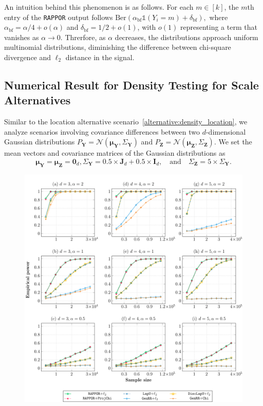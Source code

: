 \documentclass[twoside,11pt]{article}
\newcommand{\rvTwo}{Y}
\newcommand{\rvThree}{Z}
\newcommand{\vectorize}[1]{\mathbf{#1}}
\newcommand{\sampleIndexOne}{i}
\newcommand{\dimDensity}{d} %
\newcommand{\alphabetSize}{k} %
\newcommand{\vectorIndex}{m}
\newcommand{\privacyParameter}{\alpha} %
\newcommand{\privacyParameterrappor}{\privacyParameter_{\mathrm{bf}}}
\newcommand{\smallNumber}{\delta}
\newcommand{\smallNumberrappor}{\smallNumber_{\mathrm{bf}}}
\begin{document}
\begin{appendix}
	An intuition behind this phenomenon is as follows. For each $\vectorIndex \in [\alphabetSize]$, the $\vectorIndex$th entry of the \texttt{RAPPOR} output follows  
	$
	\mathrm{Ber} \left( \privacyParameterrappor \mathds{1}(\rvTwo_{\sampleIndexOne} = \vectorIndex) + \smallNumberrappor \right),
	$
	where $\privacyParameterrappor = \privacyParameter/4 + o(\privacyParameter)$ and $\smallNumberrappor = 1/2 + o(1)$, with \( o(1) \) representing a term that vanishes as $\privacyParameter \to 0$. Threrfore, as $\privacyParameter$ decreases, the distributions approach uniform multinomial distributions, diminishing the difference between chi-square divergence and $\ell_2$ distance in the signal.
	
	\subsection{Numerical Result for Density Testing for Scale Alternatives}\label{simul_scale}
	Similar to the location alternative scenario~\eqref{alternative:density_location}, we analyze scenarios involving covariance differences between two $\dimDensity$-dimensional Gaussian distributions
	$P_{\vectorize{\rvTwo}} = \mathcal{N}(
	\boldsymbol{\mu}_{\vectorize{\rvTwo}}
	,
	\Sigma_{\vectorize{\rvTwo}}
	)$
	and
	$P_{\vectorize{\rvThree}} = \mathcal{N}(
	\boldsymbol{\mu}_{\vectorize{\rvThree}}
	,
	\Sigma_{\vectorize{\rvThree}}
	)$. 
	We set the mean vectors and covariance matrices of the Gaussian distributions as
	\begin{equation}\label{alternative:density_scale}
		\boldsymbol{\mu}_{\vectorize{\rvTwo}}
		=
		\boldsymbol{\mu}_{\vectorize{\rvThree}}
		= \mathbf{0}_{\dimDensity},
		\Sigma_{\vectorize{\rvTwo}} = 
		0.5\times \mathbf{J}_{\dimDensity}
		+
		0.5 \times \mathbf{I}_{\dimDensity},
		\quad \text{and} \quad
		\Sigma_{\vectorize{\rvThree}}
		=
		5\times \Sigma_{\vectorize{\rvTwo}}.
	\end{equation}
	\begin{figure}
		\centering
		\includegraphics[width=0.95\linewidth]{density_scale.pdf}

\end{figure}
\end{appendix}
\end{document}
